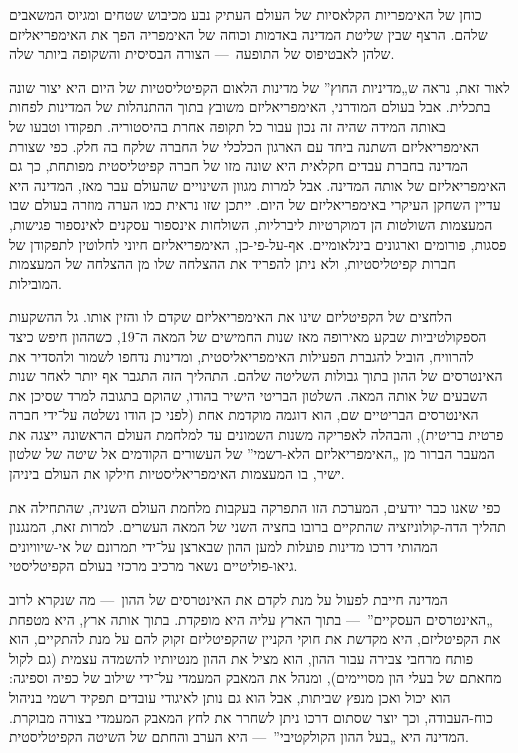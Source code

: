 כוחן של האימפריות הקלאסיות של העולם העתיק נבע מכיבוש שטחים ומגיוס המשאבים שלהם. הרצף שבין שליטת המדינה באדמות וכוחה של האימפריה הפך את האימפריאליזם שלהן לאבטיפוס של התופעה~— הצורה הבסיסית והשקופה ביותר שלה.

לאור זאת, נראה ש„מדיניות החוץ” של מדינות הלאום הקפיטליסטיות של היום היא יצור שונה בתכלית. אבל בעולם המודרני, האימפריאליזם משובץ בתוך ההתנהלות של המדינות לפחות באותה המידה שהיה זה נכון עבור כל תקופה אחרת בהיסטוריה. תפקודו וטבעו של האימפריאליזם השתנה ביחד עם הארגון הכלכלי של החברה שלקח בה חלק. כפי שצורת המדינה בחברת עבדים חקלאית היא שונה מזו של חברה קפיטליסטית מפותחת, כך גם האימפריאליזם של אותה המדינה. אבל למרות מגוון השינויים שהעולם עבר מאז, המדינה היא עדיין השחקן העיקרי באימפריאליזם של היום. ייתכן שזו נראית כמו הערה מוזרה בעולם שבו המעצמות השולטות הן דמוקרטיות ליברליות, השולחות אינספור עסקנים לאינספור פגישות, פסגות, פורומים וארגונים בינלאומיים. אף-על-פי-כן, האימפריאליזם חיוני לחלוטין לתפקודן של חברות קפיטליסטיות, ולא ניתן להפריד את ההצלחה שלו מן ההצלחה של המעצמות המובילות.

הלחצים של הקפיטליזם שינו את האימפריאליזם שקדם לו והזין אותו. גל ההשקעות הספקולטיביות שבקע מאירופה מאז שנות החמישים של המאה ה־19, כשההון חיפש כיצד להרוויח, הוביל להגברת הפעילות האימפריאליסטית, ומדינות נדחפו לשמור ולהסדיר את האינטרסים של ההון בתוך גבולות השליטה שלהם. התהליך הזה התגבר אף יותר לאחר שנות השבעים של אותה המאה. השלטון הבריטי הישיר בהודו, שהוקם בתגובה למרד שסיכן את האינטרסים הבריטיים שם, הוא דוגמה מוקדמת אחת (לפני כן הודו נשלטה על־ידי חברה פרטית בריטית), והבהלה לאפריקה משנות השמונים עד למלחמת העולם הראשונה ייצגה את המעבר הברור מן „האימפריאליזם הלא-רשמי” של העשורים הקודמים אל שיטה של שלטון ישיר, בו המעצמות האימפריאליסטיות חילקו את העולם ביניהן.

כפי שאנו כבר יודעים, המערכת הזו התפרקה בעקבות מלחמת העולם השניה, שהתחילה את תהליך הדה-קולוניזציה שהתקיים ברובו בחציה השני של המאה העשרים. למרות זאת, המנגנון המהותי דרכו מדינות פועלות למען ההון שבארצן על־ידי  תמרונם של אי-שיוויונים גיאו-פוליטיים נשאר מרכיב מרכזי בעולם הקפיטליסטי.

המדינה חייבת לפעול על מנת לקדם את האינטרסים של ההון~— מה שנקרא לרוב „האינטרסים העסקיים”~— בתוך הארץ עליה היא מופקדת. בתוך אותה ארץ, היא מטפחת את הקפיטליזם, היא מקדשת את חוקי הקניין שהקפיטליזם זקוק להם על מנת להתקיים, הוא פותח מרחבי צבירה עבור ההון, הוא מציל את ההון מנטיותיו להשמדה עצמית (גם לקול מחאתם של בעלי הון מסויימים), ומנהל את המאבק המעמדי על־ידי שילוב של כפיה וספיגה: הוא יכול ואכן מנפץ שביתות, אבל הוא גם נותן לאיגודי עובדים תפקיד רשמי בניהול כוח-העבודה, וכך יוצר שסתום דרכו ניתן לשחרר את לחץ המאבק המעמדי בצורה מבוקרת. המדינה היא „בעל ההון הקולקטיבי”~— היא הערב והחתם של השיטה הקפיטליסטית.

